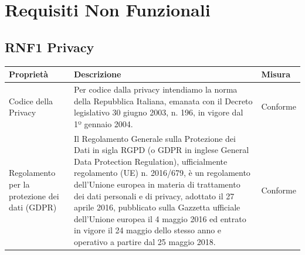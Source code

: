 \documentclass{article}
\begin{document}
\section{Requisiti Non Funzionali}
\renewcommand\thesubsection{}
\subsection{RNF1 Privacy}
\begin{center}
    \begin{longtable}{|p{4cm}|p{8cm}|p{4cm}|}
        \hline
        Proprietà                                     & Descrizione                                                                                                                                                                                                                                                                                                                                                                                                                                                            & Misura   \\
        \hline
        Codice della Privacy                          & Per codice dalla privacy intendiamo la norma della Repubblica Italiana, emanata con il Decreto legislativo 30 giugno 2003, n. 196, in vigore dal 1º gennaio 2004.                                                                                                                                                                                                                                                                                                      & Conforme \\
        \hline
        Regolamento per la protezione dei dati (GDPR) & Il Regolamento Generale sulla Protezione dei Dati in sigla RGPD (o GDPR in inglese General Data Protection Regulation), ufficialmente regolamento (UE) n. 2016/679, è un regolamento dell'Unione europea in materia di trattamento dei dati personali e di privacy, adottato il 27 aprile 2016, pubblicato sulla Gazzetta ufficiale dell'Unione europea il 4 maggio 2016 ed entrato in vigore il 24 maggio dello stesso anno e operativo a partire dal 25 maggio 2018. & Conforme \\
        \hline
    \end{longtable}
\end{center}
\end{document}

